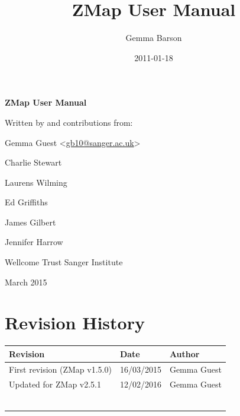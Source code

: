 \documentclass[letterpaper]{article}
\title{ZMap User Manual}
\author{Gemma Barson}
\date{2011-01-18}
\begin{document}
\setcounter{page}{1}\pagestyle{Standard}


\thispagestyle{FirstPage}
{\centering\sffamily\bfseries\color[rgb]{0.0,0.27058825,0.5254902}
\Huge\bf{ZMap User Manual}\par}

\bigskip

{\centering\large{Written by and contributions from:}\par
\large{Gemma Guest} {\textless}\href{mailto:gb10@sanger.ac.uk}{gb10@sanger.ac.uk}{\textgreater}\par
\large{Charlie Stewart}\par
\large{Laurens Wilming}\par
\large{Ed Griffiths}\par
\large{James Gilbert}\par
\large{Jennifer Harrow}\par
}


\bigskip

{\centering\large{Wellcome Trust Sanger Institute}\par}
{ March 2015\par}



\clearpage
{\color[rgb]{0.0,0.27058825,0.5254902}\section[Revision History]{Revision History}}
\hypertarget{RefHeading334316266717}{}

\begin{center}
\tablehead{}
\begin{supertabular}{|m{8cm}|m{3.2849998cm}|m{3.282cm}|}
\hline
\bfseries Revision &
\bfseries Date &
\bfseries Author\\\hline
 First revision (ZMap v1.5.0) &
 16/03/2015 &
 Gemma Guest\\\hline
 Updated for ZMap v2.5.1 &
 12/02/2016 &
 Gemma Guest\\\hline
 &
 &
 \\\hline
 &
 &
 \\\hline
 &
 &
 \\\hline
 &
 &
 \\\hline
 &
 &
 \\\hline
 &
 &
 \\\hline
\end{supertabular}
\end{center}

\bigskip
\end{document}
